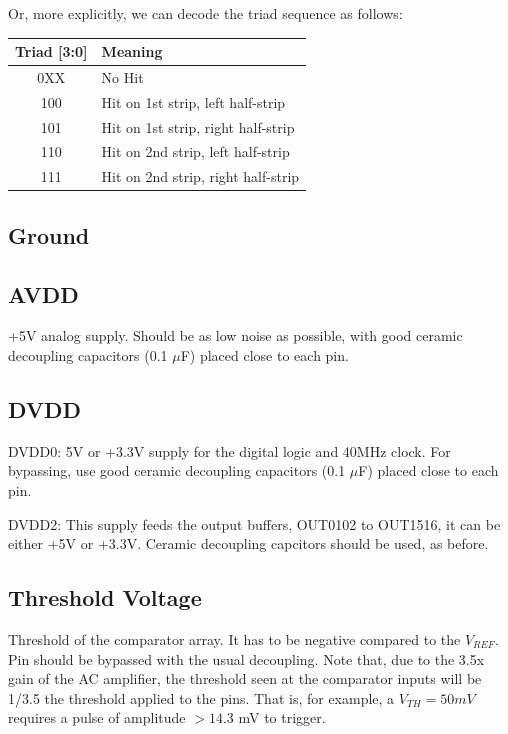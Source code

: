 \documentclass[letterpaper]{article}
\begin{document}
Or, more explicitly, we can decode the triad sequence as follows:

\renewcommand{\arraystretch}{1.2}
\begin{table}[H]
\begin{center}
\begin{tabular}{c l}
    \textbf{Triad [3:0]} & \textbf{Meaning} \\
    \midrule
    0XX & No Hit \\
    100 & Hit on 1st strip, left half-strip\\
    101 & Hit on 1st strip, right half-strip\\
    110 & Hit on 2nd strip, left half-strip \\
    111 & Hit on 2nd strip, right half-strip \\
\end{tabular}
\end{center}
\end{table}

\subsection{Ground}

\subsection{AVDD}

+5V analog supply. Should be as low noise as possible, with good ceramic decoupling capacitors (0.1 $\mu$F) placed close to each pin.

\subsection{DVDD}


DVDD0: 5V or +3.3V supply for the digital logic and 40MHz clock. For bypassing, use good ceramic decoupling capacitors (0.1 $\mu$F) placed close to each pin.

DVDD2: This supply feeds the output buffers, OUT0102 to OUT1516, it can be either +5V or +3.3V. Ceramic decoupling capcitors should be used, as before.

\subsection{Threshold Voltage}

Threshold of the comparator array. It has to be negative compared to the $V_{REF}$. Pin should be bypassed with the usual decoupling. Note that, due to the 3.5x gain of the AC amplifier, the threshold seen at the comparator inputs will be 1/3.5 the threshold applied to the pins. That is, for example, a $V_{TH}=50 mV$ requires a pulse of amplitude $>14.3$ mV to trigger.
\end{document}

